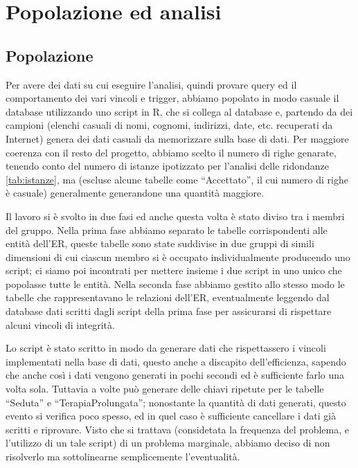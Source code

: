 \documentclass[11pt]{article}
\begin{document}
\section{Popolazione ed analisi}
\subsection{Popolazione}
\label{pop:popolazione}
Per avere dei dati su cui eseguire l'analisi, quindi provare query ed il comportamento dei vari vincoli e trigger, abbiamo popolato in modo casuale il database utilizzando uno script in R, che si collega al database e, partendo da dei campioni (elenchi casuali di nomi, cognomi, indirizzi, date, etc. recuperati da Internet) genera dei dati casuali da memorizzare sulla base di dati.
Per maggiore coerenza con il resto del progetto, abbiamo scelto il numero di righe genarate, tenendo conto del numero di istanze ipotizzato per l'analisi delle ridondanze \ref{tab:istanze}, ma (escluse alcune tabelle come ``Accettato'', il cui numero di righe è casuale) generalmente generandone una quantità maggiore.

Il lavoro si è svolto in due fasi ed anche questa volta è stato diviso tra i membri del gruppo. Nella prima fase abbiamo separato le tabelle corrispondenti alle entità dell'ER, queste tabelle sono state suddivise in due gruppi di simili dimensioni di cui ciascun membro si è occupato individualmente producendo uno script; ci siamo poi incontrati per mettere insieme i due script in uno unico che popolasse tutte le entità.
Nella seconda fase abbiamo gestito allo stesso modo le tabelle che rappresentavano le relazioni dell'ER, eventualmente leggendo dal database dati scritti dagli script della prima fase per assicurarsi di rispettare alcuni vincoli di integrità.

Lo script è stato scritto in modo da generare dati che rispettassero i vincoli implementati nella base di dati, questo anche a discapito dell'efficienza, sapendo che anche così i dati vengono generati in pochi secondi ed è sufficiente farlo una volta sola.
Tuttavia a volte può generare delle chiavi ripetute per le tabelle ``Seduta'' e ``TerapiaProlungata''; nonostante la quantità di dati generati, questo evento si verifica poco spesso, ed in quel caso è sufficiente cancellare i dati già scritti e riprovare. Visto che si trattava (considetata la frequenza del problema, e l'utilizzo di un tale script) di un problema marginale, abbiamo deciso di non risolverlo ma sottolinearne semplicemente l'eventualità.
\end{document}
